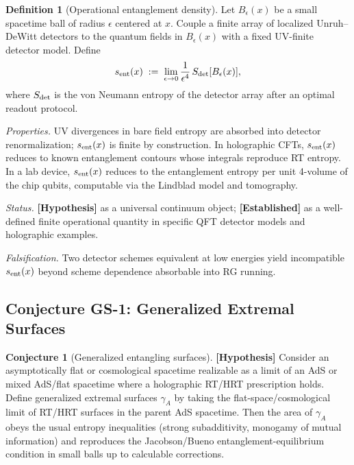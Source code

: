 \documentclass[12pt,letterpaper]{article}
\theoremstyle{definition}
\newtheorem{definition}[theorem]{Definition}
\newtheorem{conjecture}[theorem]{Conjecture}
\theoremstyle{remark}
\newcommand{\established}{\textbf{[Established]}}
\newcommand{\hypothesis}{\textbf{[Hypothesis]}}
\newcommand{\sent}{s_{\rm ent}}
\begin{document}
\begin{definition}[Operational entanglement density] \label{def:ED1}
Let $B_\epsilon(x)$ be a small spacetime ball of radius $\epsilon$ centered at $x$.
Couple a finite array of localized Unruh--DeWitt detectors to the quantum fields in
$B_\epsilon(x)$ with a fixed UV-finite detector model.
Define
\begin{equation}
\sent(x) \;:=\; \lim_{\epsilon\to 0} \frac{1}{\epsilon^4}\,S_{\rm det}[B_\epsilon(x)],
\end{equation}
where $S_{\rm det}$ is the von Neumann entropy of the detector array after an optimal
readout protocol.
\end{definition}

\textit{Properties.}
UV divergences in bare field entropy are absorbed into detector renormalization;
$\sent(x)$ is finite by construction.
In holographic CFTs, $\sent(x)$ reduces to known entanglement contours whose integrals
reproduce RT entropy.
In a lab device, $\sent(x)$ reduces to the entanglement entropy per unit 4-volume of
the chip qubits, computable via the Lindblad model and tomography.

\textit{Status.} \hypothesis{} as a universal continuum object;
\established{} as a well-defined finite operational quantity in specific QFT detector
models and holographic examples.

\textit{Falsification.} Two detector schemes equivalent at low energies yield
incompatible $\sent(x)$ beyond scheme dependence absorbable into RG running.

\subsection{Conjecture GS-1: Generalized Extremal Surfaces}

\begin{conjecture}[Generalized entangling surfaces] \label{conj:GS1}
\hypothesis{}
Consider an asymptotically flat or cosmological spacetime realizable as a limit of an
AdS or mixed AdS/flat spacetime where a holographic RT/HRT prescription holds.
Define generalized extremal surfaces $\gamma_A$ by taking the flat-space/cosmological
limit of RT/HRT surfaces in the parent AdS spacetime.
Then the area of $\gamma_A$ obeys the usual entropy inequalities (strong subadditivity,
monogamy of mutual information) and reproduces the Jacobson/Bueno entanglement-equilibrium
condition in small balls up to calculable corrections.
\end{conjecture}
\end{document}

